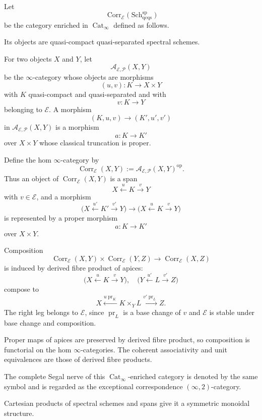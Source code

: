 \begin{definition}
\label{def:exceptional-correspondences}
Let
\[
    \operatorname{Corr}_{\mathcal E}
    \bigl(
      \operatorname{Sch}^{\mathrm{sp}}_{\mathrm{qcqs}}
    \bigr)
\]
be the category enriched in \(\operatorname{Cat}_\infty\) defined as
follows.

Its objects are quasi-compact quasi-separated spectral schemes.

For two objects \(X\) and \(Y\), let
\[
    \mathcal A_{\mathcal E,\mathcal P}(X,Y)
\]
be the \(\infty\)-category whose objects are morphisms
\[
    (u,v):
    K\longrightarrow X\times Y
\]
with \(K\) quasi-compact and quasi-separated and with
\[
    v:K\longrightarrow Y
\]
belonging to \(\mathcal E\).  A morphism
\[
    (K,u,v)
    \longrightarrow
    (K',u',v')
\]
in
\(\mathcal A_{\mathcal E,\mathcal P}(X,Y)\)
is a morphism
\[
    a:K\longrightarrow K'
\]
over \(X\times Y\) whose classical truncation is proper.

Define the hom \(\infty\)-category by
\[
    \operatorname{Corr}_{\mathcal E}(X,Y)
    :=
    \mathcal A_{\mathcal E,\mathcal P}(X,Y)^{\mathrm{op}}.
\]
Thus an object of
\(\operatorname{Corr}_{\mathcal E}(X,Y)\)
is a span
\[
    X\xleftarrow{u}K\xrightarrow{v}Y
\]
with \(v\in\mathcal E\), and a morphism
\[
    \bigl(
      X\xleftarrow{u'}K'\xrightarrow{v'}Y
    \bigr)
    \longrightarrow
    \bigl(
      X\xleftarrow{u}K\xrightarrow{v}Y
    \bigr)
\]
is represented by a proper morphism
\[
    a:K\longrightarrow K'
\]
over \(X\times Y\).

Composition
\[
    \operatorname{Corr}_{\mathcal E}(X,Y)
    \times
    \operatorname{Corr}_{\mathcal E}(Y,Z)
    \longrightarrow
    \operatorname{Corr}_{\mathcal E}(X,Z)
\]
is induced by derived fibre product of apices:
\[
    \bigl(
      X\xleftarrow{u}K\xrightarrow{v}Y
    \bigr),
    \quad
    \bigl(
      Y\xleftarrow{u'}L\xrightarrow{v'}Z
    \bigr)
\]
compose to
\[
    X
    \xleftarrow{u\operatorname{pr}_K}
    K\times_YL
    \xrightarrow{v'\operatorname{pr}_L}
    Z.
\]
The right leg belongs to \(\mathcal E\), since
\(\operatorname{pr}_L\) is a base change of \(v\) and
\(\mathcal E\) is stable under base change and composition.

Proper maps of apices are preserved by derived fibre product, so
composition is functorial on the hom \(\infty\)-categories.  The coherent
associativity and unit equivalences are those of derived fibre products.

The complete Segal nerve of this
\(\operatorname{Cat}_\infty\)-enriched category is denoted by the same
symbol and is regarded as the exceptional correspondence
\((\infty,2)\)-category.

Cartesian products of spectral schemes and spans give it a symmetric
monoidal structure.
\end{definition}

